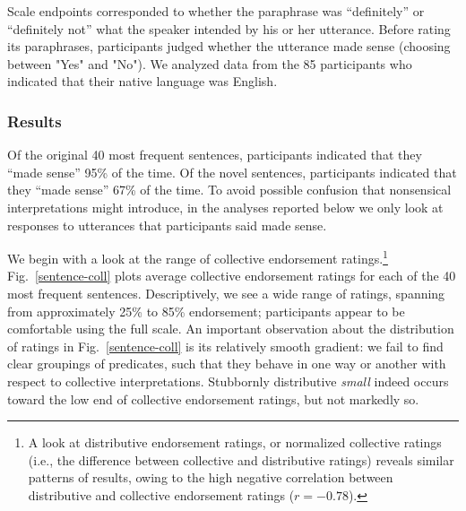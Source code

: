 \documentclass[linguex]{sp}
\newcommand{\ndg}[1]{\textcolor{Green}{[ndg: #1]}}
\begin{document}
Scale endpoints corresponded to whether the paraphrase was ``definitely'' or ``definitely not'' what the speaker intended by his or her utterance. Before rating its paraphrases, participants judged whether the utterance made sense (choosing between "Yes" and "No"). We analyzed data from the 85 participants who indicated that their native language was English.

%

\subsubsection{Results}

Of the original 40 most frequent sentences, participants indicated that they ``made sense'' 95\% of the time. Of the novel sentences, participants indicated that they ``made sense'' 67\% of the time.
To avoid possible confusion that nonsensical interpretations might introduce, in the analyses reported below we only look at responses to utterances that participants said made sense. %

We begin with a look at the range of collective endorsement ratings.\footnote{A look at distributive endorsement ratings, or normalized collective ratings (i.e., the difference between collective and distributive ratings) reveals similar patterns of results, owing to the high negative correlation between distributive and collective endorsement ratings ($r=-0.78$).} Fig.~\ref{sentence-coll} plots average collective endorsement ratings for each of the 40 most frequent sentences. Descriptively, we see a wide range of ratings, spanning from approximately 25\%  to 85\% endorsement; participants appear to be comfortable using the full scale. An important observation about the distribution of ratings in Fig.~\ref{sentence-coll} is its relatively smooth gradient: we fail to find clear groupings of predicates, such that they behave in one way or another with respect to collective interpretations. Stubbornly distributive \emph{small} indeed occurs toward the low end of collective endorsement ratings, but not markedly so.
\end{document}
